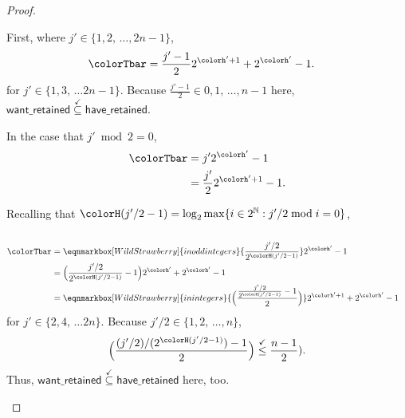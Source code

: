 \begin{proof}
\begin{proofpart}
First, where $j' \in \{1,2,\,\ldots,2n-1\}$,
\begin{align*}
\colorTbar
&= \frac{j'-1}{2} 2^{\colorh' + 1} + 2^{\colorh'} - 1.
\end{align*}
for $j' \in \{1, 3, \,\ldots 2n-1\}$.
Because $\frac{j'-1}{2} \in 0, 1, \, \ldots, n - 1$ here, $\mathsf{want\_retained} \stackrel{\checkmark}{\subseteq} \mathsf{have\_retained}$.

In the case that $j' \bmod 2 = 0$,
\begin{align*}
\colorTbar
&= j'2^{\colorh'} - 1\\
&= \frac{j'}{2}2^{\colorh' + 1} - 1.
\end{align*}

Recalling that $\colorH(j'/2 - 1) = \log_2 \max\{ i \in 2^{\mathbb{N}} : j'/2 \bmod i = 0 \}$,
\begin{align*}
\\
\colorTbar
&=
\eqnmarkbox[WildStrawberry]{inoddintegers}{
  \frac{j'/2}{2^{\colorH(j'/2 - 1)}}
}
2^{\colorh'} - 1\\
&= \Big(\frac{j'/2}{2^{\colorH(j'/2 - 1)}} - 1\Big) 2^{\colorh'} + 2^{\colorh'} - 1\\
&=
\eqnmarkbox[WildStrawberry]{inintegers}{\Big(
  \frac{
    \frac{j'/2}{2^{\colorH(j'/2 - 1)}} - 1
  }{2}
\Big)}
2^{\colorh' + 1} + 2^{\colorh'} - 1
\\
\end{align*}
for $j' \in \{2, 4, \,\ldots 2n\}$.
Because $j'/2 \in \{1, 2, \, \ldots, n\}$,
\begin{align*}
\Big(\frac{(j'/2)/(2^{\colorH(j'/2 - 1)}) - 1}{2}\Big)
\stackrel{\checkmark}{\leq} \frac{n - 1}{2}).
\end{align*}
Thus, $\mathsf{want\_retained} \stackrel{\checkmark}{\subseteq} \mathsf{have\_retained}$ here, too.
\end{proofpart}
\end{proof}
